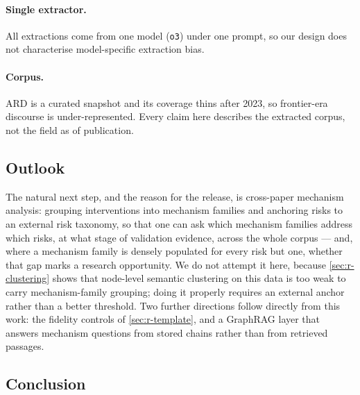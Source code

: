 \documentclass[10pt,twocolumn,letterpaper]{article}
\begin{document}
\paragraph{Single extractor.} All extractions come from one model (\texttt{o3}) under one
prompt, so our design does not characterise model-specific extraction bias.

\paragraph{Corpus.} ARD is a curated snapshot and its coverage thins after 2023, so
frontier-era discourse is under-represented. Every claim here describes the extracted
corpus, not the field as of publication.

\subsection{Outlook}
\label{sec:outlook}

The natural next step, and the reason for the release, is cross-paper mechanism analysis:
grouping interventions into mechanism families and anchoring risks to an external risk
taxonomy, so that one can ask which mechanism families address which risks, at what stage
of validation evidence, across the whole corpus --- and, where a mechanism family is
densely populated for every risk but one, whether that gap marks a research opportunity.
We do not attempt it here, because \cref{sec:r-clustering} shows that node-level semantic
clustering on this data is too weak to carry mechanism-family grouping; doing it properly
requires an external anchor rather than a better threshold. Two further directions follow
directly from this work: the fidelity controls of \cref{sec:r-template}, and a GraphRAG
layer that answers mechanism questions from stored chains rather than from retrieved
passages.

\subsection{Conclusion}
\label{sec:conclusion}
\end{document}

